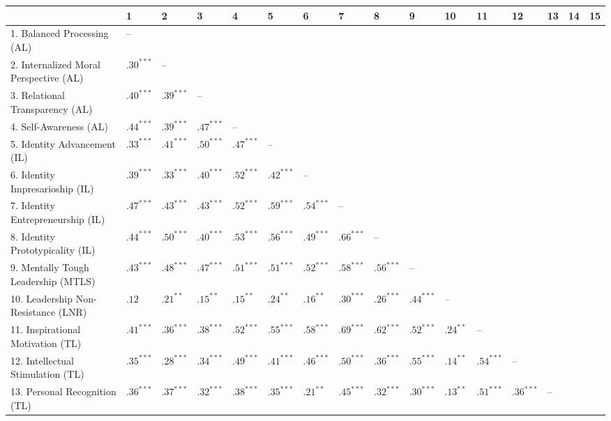 \begin{table}[ht]
\centering
\begin{tabular}{llllllllllllllll}
  \hline
 & 1 & 2 & 3 & 4 & 5 & 6 & 7 & 8 & 9 & 10 & 11 & 12 & 13 & 14 & 15 \\ 
  \hline
1. Balanced Processing (AL) & -- &  &  &  &  &  &  &  &  &  &  &  &  &  &  \\ 
  2. Internalized Moral Perspective (AL) & $.30^{***}$ & -- &  &  &  &  &  &  &  &  &  &  &  &  &  \\ 
  3. Relational Transparency (AL) & $.40^{***}$ & $.39^{***}$ & -- &  &  &  &  &  &  &  &  &  &  &  &  \\ 
  4. Self-Awareness (AL) & $.44^{***}$ & $.39^{***}$ & $.47^{***}$ & -- &  &  &  &  &  &  &  &  &  &  &  \\ 
  5. Identity Advancement (IL) & $.33^{***}$ & $.41^{***}$ & $.50^{***}$ & $.47^{***}$ & -- &  &  &  &  &  &  &  &  &  &  \\ 
  6. Identity Impresarioship (IL) & $.39^{***}$ & $.33^{***}$ & $.40^{***}$ & $.52^{***}$ & $.42^{***}$ & -- &  &  &  &  &  &  &  &  &  \\ 
  7. Identity Entrepreneurship (IL) & $.47^{***}$ & $.43^{***}$ & $.43^{***}$ & $.52^{***}$ & $.59^{***}$ & $.54^{***}$ & -- &  &  &  &  &  &  &  &  \\ 
  8. Identity Prototypicality (IL) & $.44^{***}$ & $.50^{***}$ & $.40^{***}$ & $.53^{***}$ & $.56^{***}$ & $.49^{***}$ & $.66^{***}$ & -- &  &  &  &  &  &  &  \\ 
  9. Mentally Tough Leadership (MTLS) & $.43^{***}$ & $.48^{***}$ & $.47^{***}$ & $.51^{***}$ & $.51^{***}$ & $.52^{***}$ & $.58^{***}$ & $.56^{***}$ & -- &  &  &  &  &  &  \\ 
  10. Leadership Non-Resistance (LNR) & $.12$ & $.21^{**}$ & $.15^{**}$ & $.15^{**}$ & $.24^{**}$ & $.16^{**}$ & $.30^{***}$ & $.26^{***}$ & $.44^{***}$ & -- &  &  &  &  &  \\ 
  11. Inspirational Motivation (TL) & $.41^{***}$ & $.36^{***}$ & $.38^{***}$ & $.52^{***}$ & $.55^{***}$ & $.58^{***}$ & $.69^{***}$ & $.62^{***}$ & $.52^{***}$ & $.24^{**}$ & -- &  &  &  &  \\ 
  12. Intellectual Stimulation (TL) & $.35^{***}$ & $.28^{***}$ & $.34^{***}$ & $.49^{***}$ & $.41^{***}$ & $.46^{***}$ & $.50^{***}$ & $.36^{***}$ & $.55^{***}$ & $.14^{**}$ & $.54^{***}$ & -- &  &  &  \\ 
  13. Personal Recognition (TL) & $.36^{***}$ & $.37^{***}$ & $.32^{***}$ & $.38^{***}$ & $.35^{***}$ & $.21^{**}$ & $.45^{***}$ & $.32^{***}$ & $.30^{***}$ & $.13^{**}$ & $.51^{***}$ & $.36^{***}$ & -- &  &  \\ 

\end{tabular}
\end{table}
